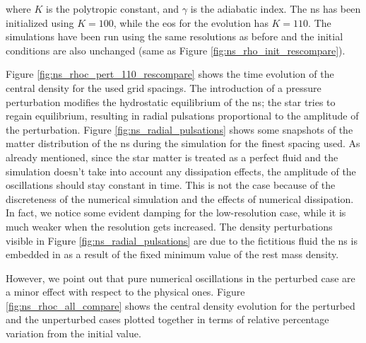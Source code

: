 \documentclass[11pt, a4paper]{article}
\begin{document}
\noindent
where \(K\) is the polytropic constant, and \(\gamma\) is the adiabatic index. The \acrlong{ns} has been initialized using \(K = 100\), while the \acrshort{eos} for the evolution has \(K = 110\). The simulations have been run using the same resolutions as before and the initial conditions are also unchanged (same as Figure \ref{fig:ns_rho_init_rescompare}).

Figure \ref{fig:ns_rhoc_pert_110_rescompare} shows the time evolution of the central density for the used grid spacings. The introduction of a pressure perturbation modifies the hydrostatic equilibrium of the \acrshort{ns}; the star tries to regain equilibrium, resulting in radial pulsations proportional to the amplitude of the perturbation. Figure \ref{fig:ns_radial_pulsations} shows some snapshots of the matter distribution of the \acrshort{ns} during the simulation for the finest spacing used. As already mentioned, since the star matter is treated as a perfect fluid and the simulation doesn't take into account any dissipation effects, the amplitude of the oscillations should stay constant in time. This is not the case because of the discreteness of the numerical simulation and the effects of numerical dissipation. In fact, we notice some evident damping for the low-resolution case, while it is much weaker when the resolution gets increased. The density perturbations visible in Figure \ref{fig:ns_radial_pulsations} are due to the fictitious fluid the \acrshort{ns} is embedded in as a result of the fixed minimum value of the rest mass density.

However, we point out that pure numerical oscillations in the perturbed case are a minor effect with respect to the physical ones. Figure \ref{fig:ns_rhoc_all_compare} shows the central density evolution for the perturbed and the unperturbed cases plotted together in terms of relative percentage variation from the initial value.

\newpage
\end{document}
